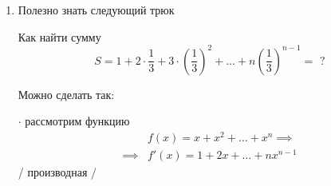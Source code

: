 \documentclass[a4paper]{article}
\begin{document}
\begin{enumerate}
\begin{proof}
            Пользуясь индукцией мы получаем, что
            \begin{equation}
               (a_1 a_2 \dots a_{2^k})^{\frac{1}{2^k}} \leq \frac{a_1 + \dots + a_{2^k}}{2^k} \text{ для } \forall k
               \tag{$\star\star$}
           \end{equation}

           [Проверьте эту индукцию аккуратно!]

           Заметим, что мы доказали ($\star$) не для всех $n \in \mathbb{N}$, а только для степеней двойки (т.е. $P_1, P_2, P_4, P_8, \dots$)

           А как доказать для остальных $n \in \mathbb{N}$?

           На самом деле все уже доказано, просто надо понять почему.

           Пусть $n \in \mathbb{N}$ -- произвольно и $a_1, a_2, \dots, a_n$ наши числа $\implies$ существует такое $k \in \mathbb{N}$, что $n \leq 2^k$.

           Положим $b_j = \begin{cases}
               a_i, & \text{если } i \leq n \\
               A, & \text{если } n < i \leq 2^k
           \end{cases}$, где $A = \frac{a_1 + \dots + a_n}{n}$

           Применим ($\star\star$) к $b_1, b_2, \dots, b_{2^k} \implies \left(a_1 a_2 \dots a_n A^{2^k - n}\right)^\frac{1}{2^k} \leq \frac{\overbrace{a_1 + \dots + a_n}^{= nA} + (2^k - n) A}{2^k} = A \\ \implies (a_1 \dots a_n)^\frac{1}{2^k} \leq A^\frac{n}{2^k} \implies (\star)$
        \end{proof}

    \item
        Полезно знать следующий трюк

        Как найти сумму 
        \[
            S = 1 + 2 \cdot \frac{1}{3} + 3 \cdot \left(\frac{1}{3}\right)^2 + \dots + n \left(\frac{1}{3}\right)^{n - 1} = \text{ ?}
        \]

        Можно сделать так:

        $\cdot$ рассмотрим функцию 
        \begin{align*}
            &f(x) = x + x^2 + \dots + x^n \implies \\
            \implies &f'(x) = 1 + 2x + \dots + n x^{n - 1}
        \end{align*}
        / производная /


\end{enumerate}
\end{document}
